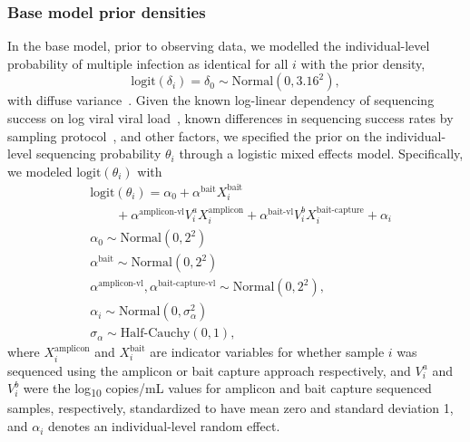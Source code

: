 \documentclass[10pt,letterpaper]{article}
\begin{document}
\subsubsection{Base model prior densities}
In the base model, prior to observing data, we modelled the individual-level probability of multiple infection as identical for all $i$ with the prior density, 
\begin{equation}
\label{eq:model_prob_mi}
\text{logit}\left(\delta_i\right) = \delta_0 \sim \text{Normal}(0,3.16^2),
\end{equation}
with diffuse variance~\cite{stan2024}. Given the known log-linear dependency of sequencing success on log viral viral load~\cite{bonsall2020}, known differences in sequencing success rates by sampling protocol~\cite{monod2023}, and other factors, we specified the prior on the individual-level sequencing probability $\theta_i$ through a logistic mixed effects model. Specifically, we modeled $\text{logit}(\theta_i)$ with 
\begin{equation}
\begin{split}
&\text{logit}\left(\theta_i\right) = 
\alpha_0 + \alpha^{\text{bait}} X^{\text{bait}}_i \\
&\quad\quad + \alpha^{\text{amplicon-vl}} V_i^a X^{\text{amplicon}}_i + \alpha^{\text{bait-vl}}V_i^b X^{\text{bait-capture}}_i + \alpha_i\\
& \alpha_0 \sim \text{Normal}(0,2^2) \\
& \alpha^{\text{bait}} \sim \text{Normal}(0,2^2) \\
& \alpha^{\text{amplicon-vl}}, \alpha^{\text{bait-capture-vl}} \sim \text{Normal}(0,2^2),\\
& \alpha_i \sim \text{Normal}(0, \sigma_{\alpha}^2) \\
& \sigma_{\alpha} \sim \text{Half-Cauchy}(0,1),
\end{split}
\end{equation}
where $X^{\text{amplicon}}_i$ and $X^{\text{bait}}_i$ are indicator variables for whether sample $i$ was sequenced using the amplicon or bait capture approach respectively, and $V_i^a$ and $V_i^b$ were the log\textsubscript{10} copies/mL values for amplicon and bait capture sequenced samples, respectively, standardized to have mean zero and standard deviation 1, and $\alpha_i$ denotes an individual-level random effect. 
\end{document}
